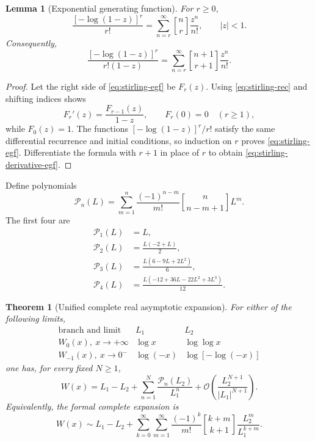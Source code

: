 \documentclass[11pt]{article}
\newtheorem{theorem}{Theorem}[section]
\newtheorem{lemma}[lemma]{Lemma}
\theoremstyle{remark}
\newcommand{\Wz}{W_0}
\newcommand{\Wm}{W_{-1}}
\newcommand{\bigO}{\mathcal O}
\newcommand{\stirling}[2]{\genfrac{[}{]}{0pt}{}{#1}{#2}}
\newcommand{\abs}[1]{\left|#1\right|}
\begin{document}
\begin{lemma}[Exponential generating function]\label{lem:stirling-egf}
For \(r\geq0\),
\begin{equation}\label{eq:stirling-egf}
 \frac{[-\log(1-z)]^r}{r!}
 =\sum_{n=r}^{\infty}\stirling{n}{r}\frac{z^n}{n!},
 \qquad |z|<1.
\end{equation}
Consequently,
\begin{equation}\label{eq:stirling-derivative-egf}
 \frac{[-\log(1-z)]^r}{r!(1-z)}
 =\sum_{n=r}^{\infty}
   \stirling{n+1}{r+1}\frac{z^n}{n!}.
\end{equation}
\end{lemma}

\begin{proof}
Let the right side of \eqref{eq:stirling-egf} be \(F_r(z)\).
Using \eqref{eq:stirling-rec} and shifting indices shows
\[
       F_r'(z)=\frac{F_{r-1}(z)}{1-z},\qquad F_r(0)=0
       \quad(r\geq1),
\]
while \(F_0(z)=1\).  The functions
\([-\log(1-z)]^r/r!\) satisfy the same differential recurrence and initial
conditions, so induction on \(r\) proves \eqref{eq:stirling-egf}.
Differentiate the formula with \(r+1\) in place of \(r\) to obtain
\eqref{eq:stirling-derivative-egf}.
\end{proof}

Define polynomials
\begin{equation}\label{eq:Pn-asym}
 \mathcal P_n(L)
 =\sum_{m=1}^n
   \frac{(-1)^{n-m}}{m!}
   \stirling{n}{n-m+1}L^m.
\end{equation}
The first four are
\begin{align}
 \mathcal P_1(L)&=L,\label{eq:P1}\\
 \mathcal P_2(L)&=\frac{L(-2+L)}2,\label{eq:P2}\\
 \mathcal P_3(L)&=\frac{L(6-9L+2L^2)}6,\label{eq:P3}\\
 \mathcal P_4(L)&=\frac{L(-12+36L-22L^2+3L^3)}{12}.
 \label{eq:P4}
\end{align}

\begin{theorem}[Unified complete real asymptotic expansion]\label{thm:fullasym}
For either of the following limits,
\[
 \begin{array}{c|c|c}
 \text{branch and limit}&L_1&L_2\\ \hline
 \Wz(x),\ x\to+\infty&\log x&\log\log x\\
 \Wm(x),\ x\to0^-&\log(-x)&\log[-\log(-x)]
 \end{array}
\]
one has, for every fixed \(N\geq1\),
\begin{equation}\label{eq:fullasym}
 W(x)=L_1-L_2+
 \sum_{n=1}^{N}\frac{\mathcal P_n(L_2)}{L_1^n}
 +\bigO\left(
 \frac{L_2^{N+1}}{\abs{L_1}^{N+1}}
 \right).
\end{equation}
Equivalently, the formal complete expansion is
\begin{equation}\label{eq:doubleasym}
 W(x)\sim L_1-L_2+
 \sum_{k=0}^{\infty}\sum_{m=1}^{\infty}
 \frac{(-1)^k}{m!}
 \stirling{k+m}{k+1}
 \frac{L_2^m}{L_1^{k+m}}.
\end{equation}
\end{theorem}
\end{document}
